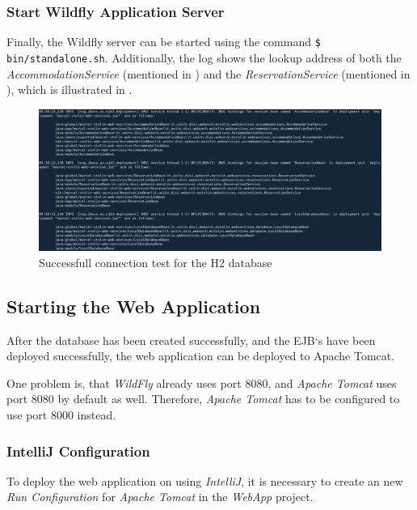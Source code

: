 \subsubsection{Start Wildfly Application Server}\label{sec:03_depl_wildfly_start}
Finally, the Wildfly server can be started using the command \texttt{\$ bin/standalone.sh}. Additionally, the log shows the lookup address of both the \textit{AccommodationService} (mentioned in ) and the \textit{ReservationService} (mentioned in ), which is illustrated in .
\begin{figure}[h]
\centering
\includegraphics[scale=0.13]{images/03_depl/deployed-beans}
\caption{Successfull connection test for the H2 database}
\label{fig:03_depl_wildfly_start_addresses}
\end{figure}


\subsection{Starting the Web Application}\label{sec:03_depl_webapp}
After the database has been created successfully, and the EJB`s have been deployed successfully, the web application can be deployed to Apache Tomcat.

One problem is, that \textit{WildFly} already uses port 8080, and \textit{Apache Tomcat} uses port 8080 by default as well. Therefore, \textit{Apache Tomcat} has to be configured to use port 8000 instead.

\subsubsection{IntelliJ Configuration}\label{sec:03_depl_webapp_intellij}
To deploy the web application on using \textit{IntelliJ}, it is necessary to create an new \textit{Run Configuration} for \textit{Apache Tomcat} in the \textit{WebApp} project.

